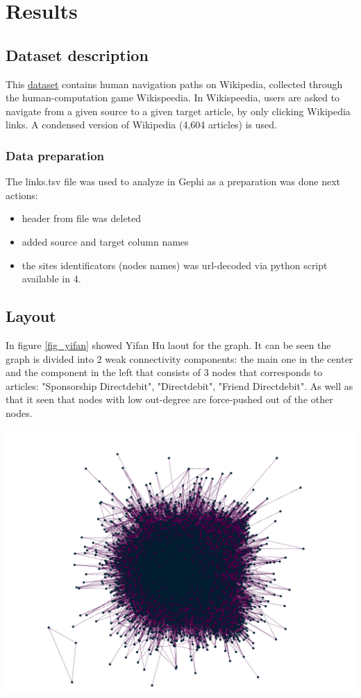 \section*{Results}

\subsection*{Dataset description}
This \href{https://snap.stanford.edu/data/wikispeedia.html}{dataset} 
contains human navigation paths on Wikipedia, collected through the human-computation 
game Wikispeedia. In Wikispeedia, users are asked to navigate from a given source to a given 
target article, by only clicking Wikipedia links. A condensed version of Wikipedia (4,604 articles) is used. 

\subsubsection*{Data preparation}

The links.tsv file was used to analyze in Gephi as a preparation was done next actions:
\begin{itemize}
    \item header from file was deleted
    \item added source and target column names
    \item the sites identificators (nodes names) was url-decoded via python script available in 4.
\end{itemize}

\subsection*{Layout}

In figure \ref{fig_yifan} showed Yifan Hu laout for the graph. It can be seen the graph is divided into
2 weak connectivity components: the main one in the center and the component in the left that consists of 3 nodes that corresponds to articles: "Sponsorship Directdebit", "Directdebit", "Friend Directdebit".
As well as that it seen that nodes with low out-degree are force-pushed out of the other nodes.

\begin{center}
    \includegraphics[width=0.75\linewidth]{../results/layout_1.png}
    \label{fig_yifan}
\end{center}


